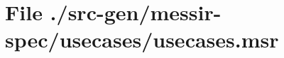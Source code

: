 \section[File /src-gen/messir-spec/usecases/usecases.msr]{File ./src-gen/messir-spec/usecases/usecases.msr}
\scriptsize

\normalsize
	
